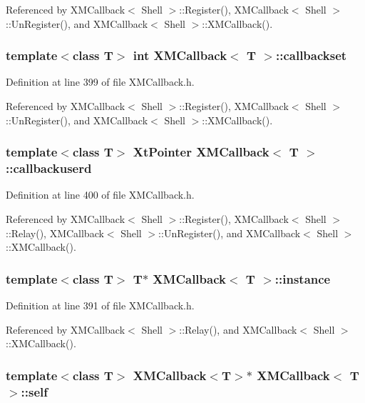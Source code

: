 Referenced by XMCallback$<$ Shell $>$::Register(), XMCallback$<$ Shell $>$::Un\-Register(), and XMCallback$<$ Shell $>$::XMCallback().
\subsubsection{\setlength{\rightskip}{0pt plus 5cm}template$<$class T$>$ int XMCallback$<$ T $>$::callbackset\hspace{0.3cm}{\tt  [private]}}\label{classXMCallback_o3}




Definition at line 399 of file XMCallback.h.

Referenced by XMCallback$<$ Shell $>$::Register(), XMCallback$<$ Shell $>$::Un\-Register(), and XMCallback$<$ Shell $>$::XMCallback().
\subsubsection{\setlength{\rightskip}{0pt plus 5cm}template$<$class T$>$ Xt\-Pointer XMCallback$<$ T $>$::callbackuserd\hspace{0.3cm}{\tt  [private]}}\label{classXMCallback_o4}




Definition at line 400 of file XMCallback.h.

Referenced by XMCallback$<$ Shell $>$::Register(), XMCallback$<$ Shell $>$::Relay(), XMCallback$<$ Shell $>$::Un\-Register(), and XMCallback$<$ Shell $>$::XMCallback().
\subsubsection{\setlength{\rightskip}{0pt plus 5cm}template$<$class T$>$ T$\ast$ XMCallback$<$ T $>$::instance\hspace{0.3cm}{\tt  [private]}}\label{classXMCallback_o0}




Definition at line 391 of file XMCallback.h.

Referenced by XMCallback$<$ Shell $>$::Relay(), and XMCallback$<$ Shell $>$::XMCallback().
\subsubsection{\setlength{\rightskip}{0pt plus 5cm}template$<$class T$>$ XMCallback$<$T$>$$\ast$ XMCallback$<$ T $>$::self\hspace{0.3cm}{\tt  [private]}}\label{classXMCallback_o6}




